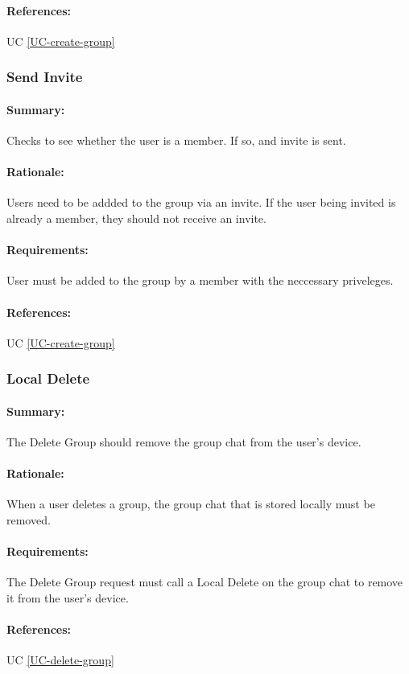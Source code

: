 \documentclass[11pt]{article}
\begin{document}
\paragraph{References:} UC \ref{UC-create-group}

\subsubsection{Send Invite} \label{FR-invite}
\paragraph{Summary:} Checks to see whether the user is a member. If so, and invite is sent.
\paragraph{Rationale:} Users need to be addded to the group via an invite. If the user being invited is already a member, they should not receive an invite.
\paragraph{Requirements:} User must be added to the group by a member with the neccessary priveleges.
\paragraph{References:} UC \ref{UC-create-group}
 
 \subsubsection{Local Delete} \label{FR-Local-Delete}
 \paragraph{Summary:} The Delete Group should remove the group chat from the user's device.
 \paragraph{Rationale:} When a user deletes a group, the group chat that is stored locally must be removed.
 \paragraph{Requirements:} The Delete Group request must call a Local Delete on the group chat to remove it from the user's device.
 \paragraph{References:} UC \ref{UC-delete-group}
 
\end{document}
